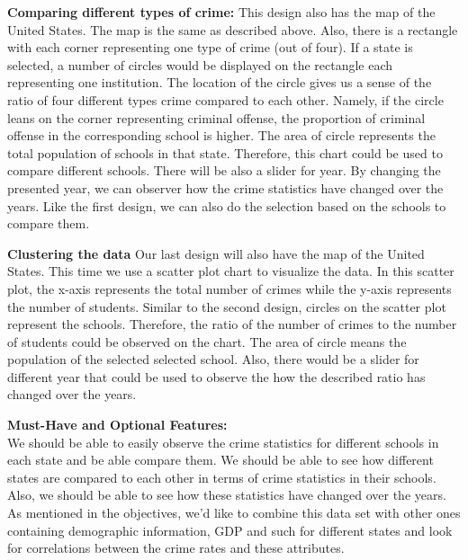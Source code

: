 \noindent
\textbf{Comparing different types of crime:} This design also has the map of the United States. The map is the same as described above. Also, there is a rectangle with each corner representing one type of crime (out of four). If a state is selected, a number of circles would be displayed on the rectangle each representing one institution. The location of the circle gives us a sense of the ratio of four different types crime compared to each other. Namely, if the circle leans on the corner representing criminal offense, the proportion of criminal offense in the corresponding school is higher. The area of circle represents the total population of schools in that state. Therefore, this chart could be used to compare different schools. There will be also a slider for year. By changing the presented year, we can observer how the crime statistics have changed over the years. Like the first design, we can also do the selection based on the schools to compare them.
	
\noindent
\textbf{Clustering the data} Our last design will also have the map of the United States. This time we use a scatter plot chart to visualize the data. In this scatter plot, the x-axis represents the total number of crimes while the y-axis represents the number of students. Similar to the second design, circles on the scatter plot represent the schools. Therefore, the ratio of the number of crimes to the number of students could be observed on the chart. The area of circle means the population of the selected selected school. Also, there would be a slider for different year that could be used to observe the how the described ratio has changed over the years.

\noindent
\textbf{Must-Have and Optional Features:}\\
We should be able to easily observe the crime statistics for different schools in each state and be able compare them. We should be able to see how different states are compared to each other in terms of crime statistics in their schools. Also, we should be able to see how these statistics have changed over the years.\\
As mentioned in the objectives, we'd like to combine this data set with other ones containing demographic information, GDP and such for different states and look for correlations between the crime rates and these attributes.

 


